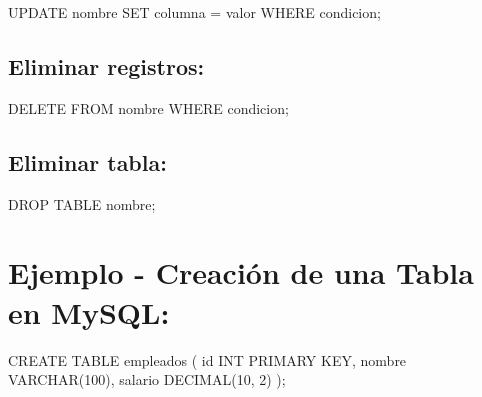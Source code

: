 \documentclass[
  a4paper,
  DIV=11,
  numbers=noendperiod,
  onepage,
  openany]{scrreprt}
\newenvironment{Shaded}{\begin{snugshade}}{\end{snugshade}}
\newcommand{\DataTypeTok}[1]{\textcolor[rgb]{0.68,0.00,0.00}{#1}}
\newcommand{\DecValTok}[1]{\textcolor[rgb]{0.68,0.00,0.00}{#1}}
\newcommand{\KeywordTok}[1]{\textcolor[rgb]{0.00,0.23,0.31}{#1}}
\newcommand{\NormalTok}[1]{\textcolor[rgb]{0.00,0.23,0.31}{#1}}
\newcommand{\OperatorTok}[1]{\textcolor[rgb]{0.37,0.37,0.37}{#1}}
\begin{document}
\begin{Shaded}
\begin{Highlighting}[]
\KeywordTok{UPDATE}\NormalTok{ nombre }\KeywordTok{SET}\NormalTok{ columna }\OperatorTok{=}\NormalTok{ valor }\KeywordTok{WHERE}\NormalTok{ condicion;}
\end{Highlighting}
\end{Shaded}

\subsection{Eliminar registros:}\label{eliminar-registros}

\begin{Shaded}
\begin{Highlighting}[]
\KeywordTok{DELETE} \KeywordTok{FROM}\NormalTok{ nombre }\KeywordTok{WHERE}\NormalTok{ condicion;}
\end{Highlighting}
\end{Shaded}

\subsection{Eliminar tabla:}\label{eliminar-tabla}

\begin{Shaded}
\begin{Highlighting}[]
\KeywordTok{DROP} \KeywordTok{TABLE}\NormalTok{ nombre;}
\end{Highlighting}
\end{Shaded}

\section{Ejemplo - Creación de una Tabla en
MySQL:}\label{ejemplo---creaciuxf3n-de-una-tabla-en-mysql}

\begin{Shaded}
\begin{Highlighting}[]
\KeywordTok{CREATE} \KeywordTok{TABLE}\NormalTok{ empleados (}
    \KeywordTok{id} \DataTypeTok{INT} \KeywordTok{PRIMARY} \KeywordTok{KEY}\NormalTok{,}
\NormalTok{    nombre }\DataTypeTok{VARCHAR}\NormalTok{(}\DecValTok{100}\NormalTok{),}
\NormalTok{    salario }\DataTypeTok{DECIMAL}\NormalTok{(}\DecValTok{10}\NormalTok{, }\DecValTok{2}\NormalTok{)}
\NormalTok{);}
\end{Highlighting}
\end{Shaded}
\end{document}
